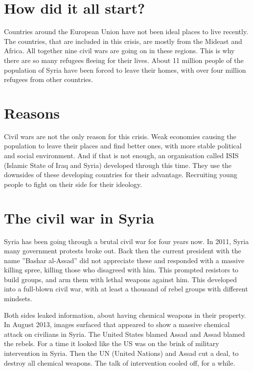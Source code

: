 
\section{How did it all start?}

Countries around the European Union have not been ideal places to live recently. The countries, that are included in this crisis, are mostly from the Mideast and Africa. All together nine civil wars are going on in these regions. This is why there are so many refugees fleeing for their lives. About 11 million people of the population of Syria have been forced to leave their homes, with over four million refugees from other countries.

\section{Reasons}

Civil wars are not the only reason for this crisis. Weak economies causing the population to leave their places and find better ones, with more stable political and social environment. And if that is not enough, an organisation called ISIS (Islamic State of Iraq and Syria) developed through this time. They use the downsides of these developing countries for their advantage. Recruiting young people to fight on their side for their ideology.

\section{The civil war in Syria}

Syria has been going through a brutal civil war for four years now. In 2011, Syria many government protests broke out.
Back then the current president with the name ''Bashar al-Assad'' did not appreciate these and responded with a massive killing spree, killing those who disagreed with him. This prompted resistors to build groups, and arm them with lethal weapons against him. This developed into a full-blown civil war, with at least a thousand of rebel groups with different mindsets.

Both sides leaked information, about having chemical weapons in their property. In August 2013, images surfaced that appeared to show a massive chemical attack on civilians in Syria. The United States blamed Assad and Assad blamed the rebels.
For a time it looked like the US was on the brink of military intervention in Syria. Then the UN (United Nations) and Assad cut a deal, to destroy all chemical weapons. The talk of intervention cooled off, for a while.

